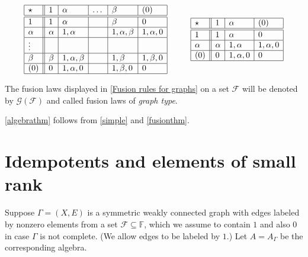 \documentclass[oneside,a4paper]{amsart} %
\theoremstyle{definition}
\begin{document}
 
\begin{table}[h!]

$$\begin{array}{|l||l|l|l|l|l|}
\hline
\star & 1 &  \alpha&\dots &\beta &(0)\\
\hline\hline
1& 1&\alpha& & \beta&0\\
\hline
\alpha& \alpha& 1,\alpha & &1,\alpha,\beta&1,\alpha,0\\
\hline
\vdots  &&&&&\phantom{a}\\
\hline
\beta &\beta& 1,\alpha,\beta&  & 1,\beta& 1,\beta,0 \\
\hline
(0)     &   0 & 1,\alpha,0&& 1,\beta,0 &0\\
\hline
\end{array}
\hspace{1cm}
\begin{array}{|l||l|l|l|}
\hline
\star & 1 &  \alpha& (0)\\
\hline\hline
1& 1&\alpha&0\\
\hline
\alpha& \alpha& 1,\alpha & 1,\alpha, 0\\
\hline
(0)     &   0 & 1,\alpha,0&0\\
\hline
\end{array}$$



\caption{Fusion law of graph type $\mathcal{G}(\mathcal{F})$ where $\mathcal{F}=\{1,\alpha,\dots,\beta,(0)\}$ and  $\mathcal{F}=\{1,\alpha,(0)\}$, where $\alpha\neq \beta$ are different from $0$ and $1$.}\label{Fusion rules for graphs}
\end{table}

The fusion laws displayed in \cref{Fusion rules for graphs} on a set $\mathcal{F}$ will be denoted by $\mathcal{G}(\mathcal{F})$ and called  fusion laws of \emph{graph type}.

\cref{algebrathm} follows from \cref{simple} and \cref{fusionthm}.




\section{Idempotents and elements of small rank}
\label{section:idempotent}
Suppose $\Gamma=(X,E)$ is a symmetric weakly connected graph  with edges labeled by nonzero elements 
from a set $\mathcal{F}\subseteq \mathbb{F}$, which we assume to contain  $1$ and also $0$ in case $\Gamma$ is not complete. (We allow edges to be labeled by $1$.)
Let $A=A_{\Gamma}$ be the corresponding  algebra.
\end{document}
